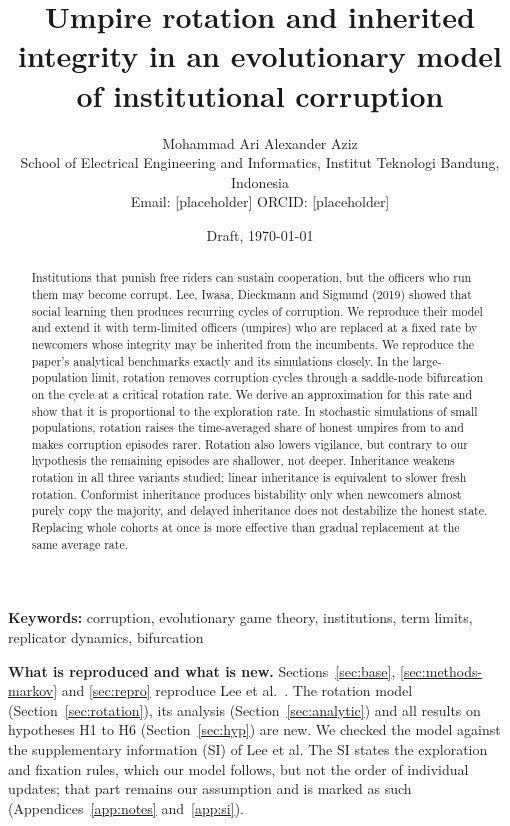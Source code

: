 \documentclass[11pt]{article}
\title{Umpire rotation and inherited integrity in an evolutionary model of institutional corruption}
\author{Mohammad Ari Alexander Aziz\\[2pt]
\small School of Electrical Engineering and Informatics, Institut Teknologi Bandung, Indonesia\\
\small Email: [placeholder] \quad ORCID: [placeholder]}
\date{Draft, \today}
\begin{document}
\maketitle

\begin{abstract}
Institutions that punish free riders can sustain cooperation, but the officers who run them may
become corrupt. Lee, Iwasa, Dieckmann and Sigmund (2019) showed that social learning then produces
recurring cycles of corruption. We reproduce their model and extend it with term-limited officers
(umpires) who are replaced at a fixed rate by newcomers whose integrity may be inherited from the
incumbents. We reproduce the paper's analytical benchmarks exactly and its simulations closely. In the large-population limit,
rotation removes corruption cycles through a saddle-node bifurcation on the cycle at a critical
rotation rate. We derive an approximation for this rate and show that it is proportional to the
exploration rate. In stochastic simulations of small populations, rotation raises the time-averaged share of honest
umpires from \HoneYSZero{} to \HoneYSMax{} and makes corruption episodes rarer. Rotation also
lowers vigilance, but contrary to our hypothesis the remaining episodes are shallower, not deeper.
Inheritance weakens rotation in all three variants studied; linear inheritance is equivalent to
slower fresh rotation. Conformist inheritance produces bistability only when newcomers almost
purely copy the majority, and delayed inheritance does not destabilize the honest state.
Replacing whole cohorts at once is more effective than gradual replacement at the same average
rate.
\end{abstract}

\noindent\textbf{Keywords:} corruption, evolutionary game theory, institutions, term limits,
replicator dynamics, bifurcation

\noindent\textbf{What is reproduced and what is new.} Sections~\ref{sec:base},
\ref{sec:methods-markov} and \ref{sec:repro} reproduce Lee et al.~\cite{lee2019social}. The
rotation model (Section~\ref{sec:rotation}), its analysis (Section~\ref{sec:analytic}) and all
results on hypotheses H1 to H6 (Section~\ref{sec:hyp}) are new. We checked the model
against the supplementary information (SI) of Lee et al. The SI states the exploration and
fixation rules, which our model follows, but not the order of individual updates; that part
remains our assumption and is marked as such (Appendices~\ref{app:notes} and~\ref{app:si}).

\end{document}
